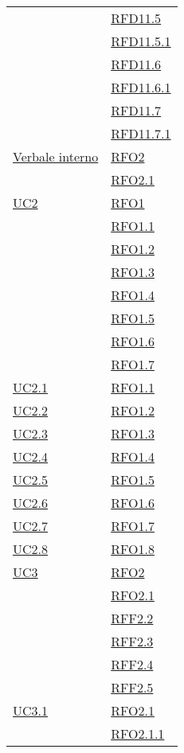 \begin{longtable}{|>{\centering}m{5cm}|m{5cm}<{\centering}|}
& \hyperlink{RFD11.5}{RFD11.5}\\
& \hyperlink{RFD11.5.1}{RFD11.5.1}\\
& \hyperlink{RFD11.6}{RFD11.6}\\
& \hyperlink{RFD11.6.1}{RFD11.6.1}\\
& \hyperlink{RFD11.7}{RFD11.7}\\
& \hyperlink{RFD11.7.1}{RFD11.7.1}\\ \hline
\hyperlink{Verbale interno}{Verbale interno} & \hyperlink{RFO2}{RFO2}\\
& \hyperlink{RFO2.1}{RFO2.1}\\ \hline
\hyperref[UC2]{UC2} & \hyperlink{RFO1}{RFO1}\\
& \hyperlink{RFO1.1}{RFO1.1}\\
& \hyperlink{RFO1.2}{RFO1.2}\\
& \hyperlink{RFO1.3}{RFO1.3}\\
& \hyperlink{RFO1.4}{RFO1.4}\\
& \hyperlink{RFO1.5}{RFO1.5}\\
& \hyperlink{RFO1.6}{RFO1.6}\\
& \hyperlink{RFO1.7}{RFO1.7}\\ \hline
\hyperref[UC2.1]{UC2.1} & \hyperlink{RFO1.1}{RFO1.1}\\ \hline
\hyperref[UC2.2]{UC2.2} & \hyperlink{RFO1.2}{RFO1.2}\\ \hline
\hyperref[UC2.3]{UC2.3} & \hyperlink{RFO1.3}{RFO1.3}\\ \hline
\hyperref[UC2.4]{UC2.4} & \hyperlink{RFO1.4}{RFO1.4}\\ \hline
\hyperref[UC2.5]{UC2.5} & \hyperlink{RFO1.5}{RFO1.5}\\ \hline
\hyperref[UC2.6]{UC2.6} & \hyperlink{RFO1.6}{RFO1.6}\\ \hline
\hyperref[UC2.7]{UC2.7} & \hyperlink{RFO1.7}{RFO1.7}\\ \hline
\hyperref[UC2.8]{UC2.8} & \hyperlink{RFO1.8}{RFO1.8}\\ \hline
\hyperref[UC3]{UC3} & \hyperlink{RFO2}{RFO2}\\
& \hyperlink{RFO2.1}{RFO2.1}\\
& \hyperlink{RFF2.2}{RFF2.2}\\
& \hyperlink{RFF2.3}{RFF2.3}\\
& \hyperlink{RFF2.4}{RFF2.4}\\
& \hyperlink{RFF2.5}{RFF2.5}\\ \hline
\hyperref[UC3.1]{UC3.1} & \hyperlink{RFO2.1}{RFO2.1}\\
& \hyperlink{RFO2.1.1}{RFO2.1.1}\\

\end{longtable}
